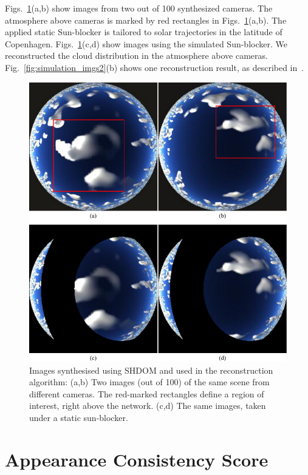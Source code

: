 \documentclass[runningheads]{llncs}
\begin{document}
Figs.~\ref{fig:simulation_imgs1}(a,b) show images from two out of 100
synthesized cameras. The atmosphere above cameras is marked by red rectangles in Figs.~\ref{fig:simulation_imgs1}(a,b). The applied static Sun-blocker is tailored to solar trajectories in the latitude of Copenhagen. Figs.~\ref{fig:simulation_imgs1}(c,d) show images using the simulated Sun-blocker.
We reconstructed the cloud distribution in the atmosphere above cameras. Fig.~\ref{fig:simulation_imgs2}(b) shows one reconstruction result, as described in~\cite{danny2014}.
\begin{figure}
  \begin{center}
    \includegraphics{figures/simulation_imgs}
    \caption{Images synthesised using SHDOM and used in the
      reconstruction algorithm: (a,b) Two images (out of 100) of the
      same scene from different cameras. The red-marked rectangles define
      a region of interest, right above the network. (c,d) The
      same images, taken under a static sun-blocker.}
    \label{fig:simulation_imgs1}
  \end{center}
\end{figure}


\section{Appearance Consistency Score}
\label{sec:appearancecore}
\end{document}
